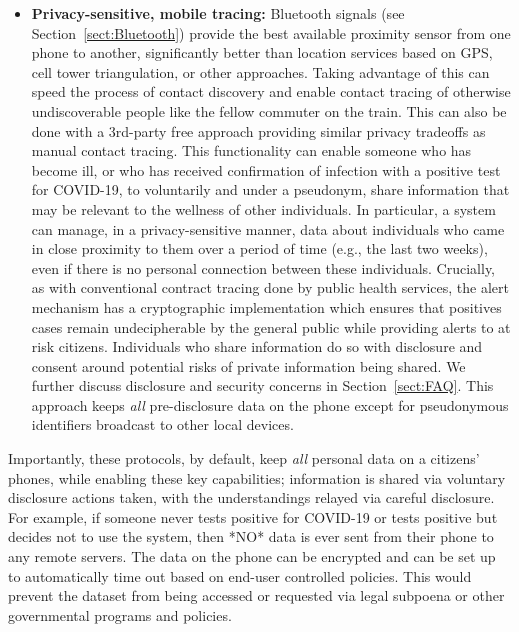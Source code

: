 \documentclass{article}
\begin{document}
\begin{itemize}
\item \textbf{Privacy-sensitive, mobile tracing:} Bluetooth signals (see Section~\ref{sect:Bluetooth}) provide the best available proximity sensor from one phone to another, significantly better than location services based on GPS, cell tower triangulation, or other approaches.  Taking advantage of this can speed the process of contact discovery and enable contact tracing of otherwise undiscoverable people like the fellow commuter on the train.  This can also be done with a 3rd-party free approach providing similar privacy tradeoffs as manual contact tracing.  
This functionality can enable someone who has become ill, or who has received confirmation of infection with a positive test for COVID-19, to voluntarily and under a pseudonym, share information that may be relevant to the wellness of other individuals.  In particular, a system can manage, in a privacy-sensitive manner, data about individuals who came in close proximity to them over a period of time (e.g., the last two weeks), even if there is no personal connection between these individuals.
Crucially, as with conventional contract tracing done by public health services, the alert mechanism has a cryptographic implementation which ensures that positives cases remain undecipherable by the general public while providing alerts to at risk citizens.  Individuals who share information do so with disclosure and consent around potential risks of private information being shared.  We further discuss disclosure and security concerns in Section~\ref{sect:FAQ}.  This approach keeps \emph{all} pre-disclosure data on the phone except for pseudonymous identifiers broadcast to other local devices.
\end{itemize}

Importantly, these protocols, by default, keep \emph{all} personal data on a citizens' phones, while enabling these key capabilities; information is shared via voluntary disclosure actions taken, with the understandings relayed via careful disclosure. For example, if someone never tests positive for COVID-19 or tests positive but decides not to use the system, then *NO* data is ever sent from their phone to any remote servers. The data on the phone can be encrypted and can be set up to automatically time out based on end-user controlled policies.  This would prevent the dataset from being accessed or requested via legal subpoena or other governmental programs and policies.
\end{document}
